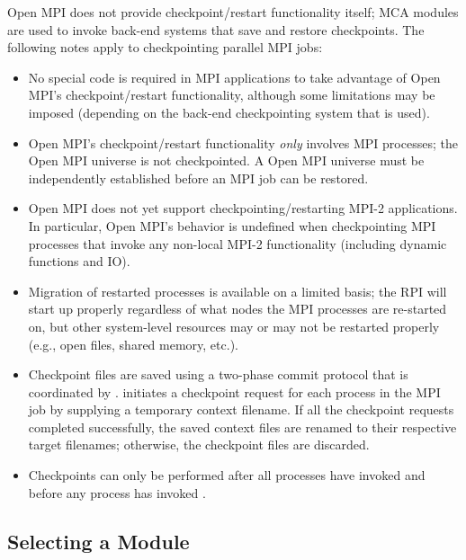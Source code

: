 Open MPI does not provide checkpoint/restart functionality itself;
 MCA modules are used to invoke back-end systems that save
and restore checkpoints.  The following notes apply to checkpointing
parallel MPI jobs:

\begin{itemize}
\item No special code is required in MPI applications to take
  advantage of Open MPI's checkpoint/restart functionality, although
  some limitations may be imposed (depending on the back-end
  checkpointing system that is used).  
  
\item Open MPI's checkpoint/restart functionality {\em only} involves MPI
  processes; the Open MPI universe is not checkpointed.  A Open MPI universe
  must be independently established before an MPI job can be restored.

\item Open MPI does not yet support checkpointing/restarting MPI-2
  applications.  In particular, Open MPI's behavior is undefined when
  checkpointing MPI processes that invoke any non-local MPI-2
  functionality (including dynamic functions and IO).  
  
\item Migration of restarted processes is available on a limited
  basis; the  RPI will start up properly regardless of what
  nodes the MPI processes are re-started on, but other system-level
  resources may or may not be restarted properly (e.g., open files,
  shared memory, etc.).

\item Checkpoint files are saved using a two-phase commit protocol that is
  coordinated by .   initiates a checkpoint request
  for each process in the MPI job by supplying a temporary context filename.
  If all the checkpoint requests completed successfully, the saved context
  files are renamed to their respective target filenames; otherwise, the
  checkpoint files are discarded.

\item Checkpoints can only be performed after all processes have
  invoked  and before any process has invoked
  .
\end{itemize}


\subsection{Selecting a  Module}


